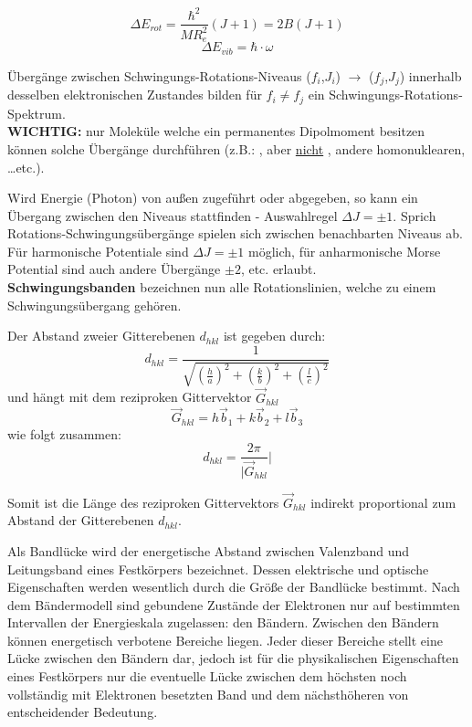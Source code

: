 \[\Delta E_{rot} = \frac{\hbar^2}{M R_e^2}(J+1) = 2B(J+1)\]
\[\Delta E_{vib} = \hbar \cdot \omega\]

\label{q:3}

Übergänge zwischen Schwingungs-Rotations-Niveaus ($f_i$,$J_i$) $\rightarrow$ ($f_j$,$J_j$) innerhalb desselben elektronischen Zustandes bilden für $f_i \neq f_j$ ein Schwingungs-Rotations-Spektrum. \\

\textbf{WICHTIG:} nur Moleküle welche ein permanentes Dipolmoment besitzen können solche Übergänge durchführen (z.B.: ,  aber \underline{nicht} , andere homonuklearen, \dots etc.).

Wird Energie (Photon) von außen zugeführt oder abgegeben, so kann ein Übergang zwischen den Niveaus stattfinden - Auswahlregel $\Delta J = \pm 1$. Sprich Rotations-Schwingungsübergänge spielen sich zwischen benachbarten Niveaus ab. Für harmonische Potentiale sind $\Delta J = \pm 1$ möglich, für anharmonische Morse Potential sind auch andere Übergänge $\pm 2$, etc. erlaubt.\\

\textbf{Schwingungsbanden} bezeichnen nun alle Rotationslinien, welche zu einem Schwingungsübergang gehören.


\label{q:4}

Der Abstand zweier Gitterebenen $d_{hkl}$ ist gegeben durch:
\[d_{hkl} = \frac{1}{\sqrt{\left(\frac{h}{a}\right)^2 + \left(\frac{k}{b}\right)^2 + \left(\frac{l}{c}\right)^2}}\]
und hängt mit dem reziproken Gittervektor $\vec{G}_{hkl}$
\[\vec{G}_{hkl} = h\vec{b}_1 + k\vec{b}_2 + l\vec{b}_3\]
wie folgt zusammen:
\[d_{hkl} = \frac{2\pi}{|\vec{G}_{hkl}}|\]

Somit ist die Länge des reziproken Gittervektors $\vec{G}_{hkl}$ indirekt proportional zum Abstand der Gitterebenen $d_{hkl}$.

\label{q:5}

Als Bandlücke wird der energetische Abstand zwischen Valenzband und Leitungsband eines Festkörpers bezeichnet. Dessen elektrische und optische Eigenschaften werden wesentlich durch die Größe der Bandlücke bestimmt.
Nach dem Bändermodell sind gebundene Zustände der Elektronen nur auf bestimmten Intervallen der Energieskala zugelassen: den Bändern. Zwischen den Bändern können energetisch verbotene Bereiche liegen. Jeder dieser Bereiche stellt eine Lücke zwischen den Bändern dar, jedoch ist für die physikalischen Eigenschaften eines Festkörpers nur die eventuelle Lücke zwischen dem höchsten noch vollständig mit Elektronen besetzten Band und dem nächsthöheren von entscheidender Bedeutung.

